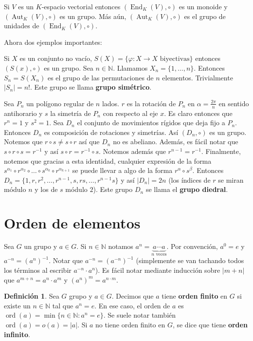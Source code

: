 \documentclass[12pt]{book}
\theoremstyle{definition}
\newtheorem{defn}[teo]{Definición}
\newcommand{\NN}{\mathbb{N}}
\DeclareMathOperator{\ord}{ord}
\DeclareMathOperator{\End}{End}
\DeclareMathOperator{\Aut}{Aut}
\begin{document}
Si $V$ es un $K$-espacio vectorial entonces $(\End_K(V),\circ)$ es un monoide y $(\Aut_K(V),\circ)$ es un grupo. Más aún, $(\Aut_K(V),\circ)$ es el grupo de unidades de $(\End_K(V),\circ)$.

Ahora dos ejemplos importantes:

Si $X$ es un conjunto no vacío, $S(X) = \{\varphi:X\to X \text{ biyectivas}\}$ entonces $(S(x),\circ)$ es un grupo. Sea $n\in\NN$. Llamamos $X_n=\{1,\ldots , n\}$. Entonces $S_n = S(X_n)$ es el grupo de las permutaciones de $n$ elementos. Trivialmente $|S_n|=n!$. Este grupo se llama \textbf{grupo simétrico}.

Sea $P_n$ un polígono regular de $n$ lados. $r$ es la rotación de $P_n$ en $\alpha = \frac{2\pi}{n}$ en sentido antihorario y $s$ la simetría de $P_n$ con respecto al eje $x$. Es claro entonces que $r^n = 1$ y $s^2 = 1$. Sea $D_n$ el conjunto de movimientos rígidos que deja fijo a $P_n$. Entonces $D_n$ es composición de rotaciones y simetrías. Así $(D_n,\circ)$ es un grupo. Notemos que $r\circ s \neq s\circ r$ así que $D_n$ no es abeliano. Además, es fácil notar que $s\circ r \circ s = r^{-1}$ y así $s\circ r = r^{-1}\circ s$. Notemos además que $r^{n-1}=r^{-1}$. Finalmente, notemos que gracias a esta identidad, cualquier expresión de la forma $s^{\alpha_1}\circ r^{\alpha_2}\circ \ldots \circ s^{\alpha_k}\circ r^{\alpha_{k+1}}$ se puede llevar a algo de la forma $r^\alpha \circ s^\beta$. Entonces $D_n = \{1,r,r^2 ,\ldots , r^{n-1}, s , rs,\ldots ,r^{n-1}s\}$ y así $|D_n| = 2n$ (los índices de $r$ se miran módulo $n$ y los de $s$ módulo $2$). Este grupo $D_n$ se llama el \textbf{grupo diedral}.

\section{Orden de elementos}
Sea $G$ un grupo y $a\in G$. Si $n\in\NN$ notamos $a^n = \underbrace{a\cdots a}_{n \text{ veces}}$. Por convención, $a^0 = e$ y $a^{-n}=(a^{n})^{-1}$. Notar que $a^{-n} = (a^{-n})^{-1}$ (simplemente se van tachando todos los términos al escribir $a^{-n}\cdot a^n$). Es fácil notar mediante inducción sobre $|m+n|$ que $a^{m+n} = a^n \cdot a^m$ y $(a^n)^m = a^{n\cdot m}$.

\begin{defn}
Sea $G$ grupo y $a\in G$. Decimos que $a$ tiene \textbf{orden finito} en $G$ si existe un $n\in\NN$ tal que $a^n = e$. En ese caso, el orden de $a$ es $\ord(a) = \min\{n\in\NN : a^n = e\}$. Se suele notar también $\ord(a)=o(a)=|a|$. Si $a$ no tiene orden finito en $G$, se dice que tiene \textbf{orden infinito}.
\end{defn}
\end{document}
